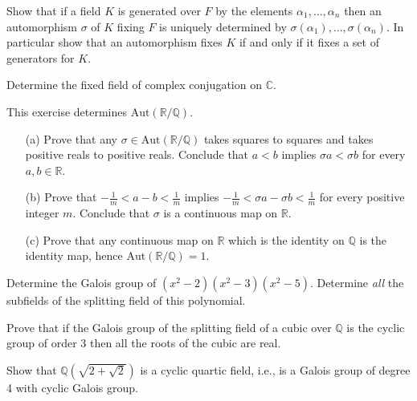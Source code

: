 \documentclass[12pt,letterpaper]{hmcpset}
\newcommand{\Rr}{\mathbb{R}}
\newcommand{\Qq}{\mathbb{Q}}
\newcommand{\Cc}{\mathbb{C}}
\newcommand{\Aut}[1]{\text{Aut} \left(#1\right) }
\begin{document}

\begin{problem}[14.1.1a]
  Show that if a field $K$ is generated over $F$ by the elements $\alpha_1, \dots , \alpha_n$ then an automorphism $\sigma$ of $K$ fixing $F$ is uniquely determined by $\sigma(\alpha_1), \dots, \sigma(\alpha_n)$. In particular show that an automorphism fixes $K$ if and only if it fixes a set of generators for $K$.
\end{problem}
\begin{solution}
\vfill
\end{solution}
\newpage

\begin{problem}[14.1.3]
  Determine the fixed field of complex conjugation on $\Cc$.
\end{problem}
\begin{solution}
\vfill
\end{solution}
\newpage

\begin{problem}[14.1.7]
  This exercise determines $\Aut{\Rr/\Qq}.$
  \begin{enumerate}
    \item [(a)] Prove that any $\sigma \in \Aut{\Rr/\Qq}$ takes squares to squares and takes positive reals to positive reals. Conclude that $a < b$ implies $\sigma a < \sigma b$ for every $a, b\in \Rr$.
    \item[(b)] Prove that $-\frac{1}{m} < a - b < \frac{1}{m}$ implies $-\frac{1}{m} < \sigma a - \sigma b < \frac{1}{m}$ for every positive integer $m$. Conclude that $\sigma $ is a continuous map on $\Rr.$
    \item[(c)] Prove that any continuous map on $\Rr$ which is the identity on $\Qq$ is the identity map, hence $\Aut{\Rr/\Qq} = 1$.
  \end{enumerate}
\end{problem}
\begin{solution}
\vfill
\end{solution}
\newpage

\begin{problem}[14.2.3]
  Determine the Galois group of $(x^2 - 2)(x^2 - 3)(x^2 - 5)$. Determine \emph{all} the subfields of the splitting field of this polynomial.
\end{problem}
\begin{solution}
\vfill
\end{solution}
\newpage

\begin{problem}[14.2.13]
  Prove that if the Galois group of the splitting field of a cubic over $\Qq$ is the cyclic group of order 3 then all the roots of the cubic are real.
\end{problem}
\begin{solution}
\vfill
\end{solution}
\newpage

\begin{problem}[14.2.14]
  Show that $\Qq(\sqrt{2+\sqrt{2}})$ is a cyclic quartic field, i.e., is a Galois group of degree 4 with cyclic Galois group.
\end{problem}
\begin{solution}
\vfill
\end{solution}
\end{document}
